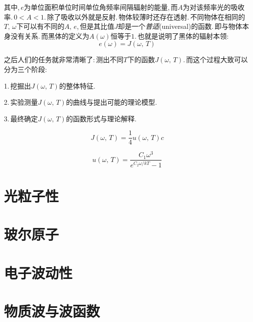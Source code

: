 其中,\,$e$为单位面积单位时间单位角频率间隔辐射的能量,\,而$A$为对该频率光的吸收率.\,$0<A<1$.\,除了吸收以外就是反射.\,物体较薄时还存在透射.\,不同物体在相同的$T,\,\omega$下可以有不同的$A,\,e$,\,但是其比值$J$却是一个\emph{普适}(universal)的函数.\,即与物体本身没有关系.\,而黑体的定义为$A(\omega)$恒等于$1$.\,也就是说明了黑体的辐射本领:
\[e(\omega)=J(\omega,\,T)\]

之后人们的任务就非常清晰了:\,测出不同$T$下的函数$J(\omega,\,T)$.\,而这个过程大致可以分为三个阶段:

1.\,挖掘出$J(\omega,\,T)$的整体特征.

2.\,实验测量$J(\omega,\,T)$的曲线与提出可能的理论模型.

3.\,最终确定$J(\omega,\,T)$的函数形式与理论解释.

\[J(\omega,\,T)=\frac{1}{4}u(\omega,\,T)c\]

\[u(\omega,\,T)=\frac{C_1\omega^3}{e^{C_2\omega/kT}-1}\]


\section{光粒子性}

\section{玻尔原子}

\section{电子波动性}

\section{物质波与波函数}

